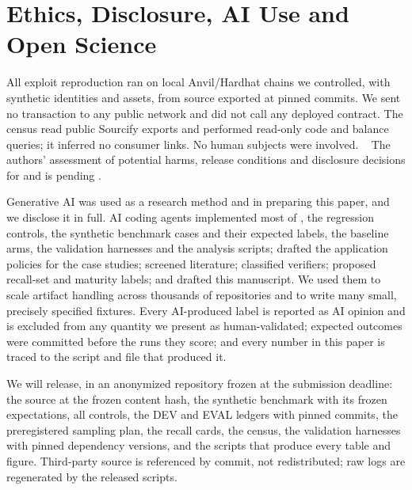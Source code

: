 \section{Ethics, Disclosure, AI Use and Open Science}\label{sec:ethics}

 All exploit reproduction ran on local Anvil/Hardhat chains we
controlled, with synthetic identities and assets, from source exported at
pinned commits. We sent no transaction to any public network and did not call
any deployed contract. The census read public Sourcify exports and performed
read-only code and balance queries; it inferred no consumer links. No human
subjects were involved.%
\
 The authors' assessment of potential
harms, release conditions and disclosure decisions for \CaseA{} and \CaseB{}
is pending \TODO{S7}.

 Generative AI was used as a research method and
in preparing this paper, and we disclose it in full. AI coding agents
implemented most of \tool{}, the regression controls, the synthetic benchmark
cases and their expected labels, the baseline arms, the validation harnesses
and the analysis scripts; drafted the application policies for the case
studies; screened literature; classified verifiers; proposed recall-set and
maturity labels; and drafted this manuscript. We used them to scale artifact
handling across thousands of repositories and to write many small,
precisely specified fixtures. Every AI-produced label is reported as AI
opinion and is excluded from any quantity we present as human-validated;
expected outcomes were committed before the runs they score; and every
number in this paper is traced to the script and file that produced it.

 We will release, in an anonymized repository frozen at
the submission deadline: the \tool{} source at the frozen content hash, the
synthetic benchmark with its frozen expectations, all controls, the DEV and
EVAL ledgers with pinned commits, the preregistered sampling plan, the
recall cards, the census, the validation harnesses with pinned dependency
versions, and the scripts that produce every table and figure. Third-party
source is referenced by commit, not redistributed; raw logs are regenerated by
the released scripts. \MISSING{anonymized artifact URL}
